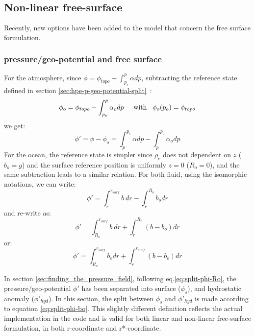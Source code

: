 


\subsection{Non-linear free-surface}
\label{sect:nonlinear-freesurface}

Recently, new options have been added to the model
that concern the free surface formulation.


\subsubsection{pressure/geo-potential and free surface}
\label{sect:phi-freesurface}

For the atmosphere, since $\phi = \phi_{topo} - \int^p_{p_s} \alpha dp$,
subtracting the reference state defined in section
\ref{sec:hpe-p-geo-potential-split}~:\\
$$
\phi_o = \phi_{topo} - \int^p_{p_o} \alpha_o dp  
\hspace{5mm}\mathrm{with}\hspace{3mm} \phi_o(p_o)=\phi_{topo}
$$
we get:
$$
\phi' = \phi - \phi_o = \int^{p_s}_p \alpha dp - \int^{p_o}_p \alpha_o dp
$$
For the ocean, the reference state is simpler since $\rho_c$ does not dependent
on $z$ ($b_o=g$) and the surface reference position is uniformly $z=0$ ($R_o=0$),
and the same subtraction leads to a similar relation.
For both fluid, using the isomorphic notations, we can write:
$$ 
\phi' = \int^{r_{surf}}_r b~ dr - \int^{R_o}_r b_o dr
$$
and re-write as:
\begin{equation}
\phi' = \int^{r_{surf}}_{R_o} b~ dr + \int^{R_o}_r (b - b_o) dr
\label{eq:split-phi-Ro}
\end{equation}
or:
\begin{equation}
\phi' = \int^{r_{surf}}_{R_o} b_o dr + \int^{r_{surf}}_r (b - b_o) dr
\label{eq:split-phi-bo}
\end{equation}

In section \ref{sec:finding_the_pressure_field}, following eq.\ref{eq:split-phi-Ro},
the pressure/geo-potential $\phi'$ has been separated into surface ($\phi_s$),
and hydrostatic anomaly ($\phi'_{hyd}$).
In this section, the split between $\phi_s$ and $\phi'_{hyd}$ is 
made according to equation \ref{eq:split-phi-bo}. This slightly
different definition reflects the actual implementation in the code 
and is valid for both linear and non-linear
free-surface formulation, in both r-coordinate and r*-coordinate.

